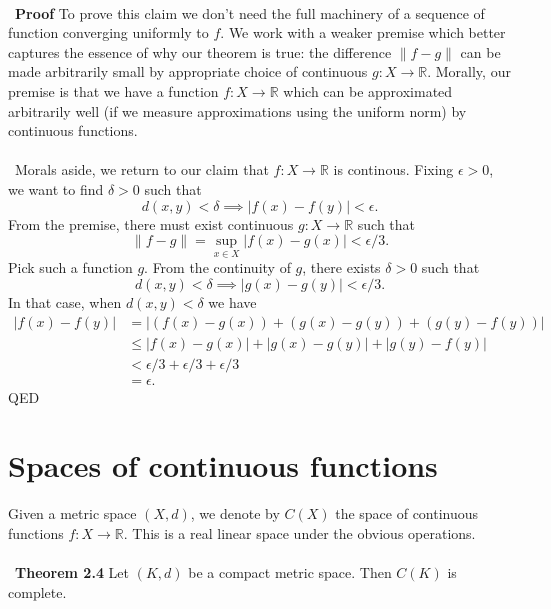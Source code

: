 \documentclass[12 pt]{article}
\newcommand{\R}{\mathbb{R}}
\newcommand{\nm}[1]{\left\| #1 \right\|}
\numberwithin{equation}{section}
\begin{document}
\\
\
\textbf{Proof} To prove this claim we don't need the full machinery of a sequence of function converging uniformly to $f$. We work with a weaker premise which better captures the essence of why our theorem is true: the difference $\nm{f - g}$ can be made arbitrarily small by appropriate choice of continuous $g: X \to \R$. Morally, our premise is that we have a function $f: X \to \R$ which can be approximated arbitrarily well (if we measure approximations using the uniform norm) by continuous functions.\\
\\
\
Morals aside, we return to our claim that $f: X \to \R$ is continous. Fixing $\epsilon > 0$, we want to find $\delta > 0$ such that \begin{equation*}
d(x,y) < \delta \implies |f(x) - f(y)| < \epsilon.
\end{equation*}
From the premise, there must exist continuous $g: X \to \R$ such that \begin{equation*}
\nm{f - g} = \sup_{x \in X} |f(x) - g(x)| < \epsilon / 3.
\end{equation*}
Pick such a function $g$. From the continuity of $g$, there exists $\delta > 0$ such that \begin{equation*}
d(x,y) < \delta \implies |g(x) - g(y)| < \epsilon / 3.
\end{equation*}
In that case, when $d(x,y) < \delta$ we have \begin{align*}
|f(x) - f(y)| & = |(f(x) - g(x)) + (g(x) - g(y)) + (g(y) - f(y))| \\
\ & \leq |f(x) - g(x)| + |g(x) - g(y)| + |g(y) - f(y)| \\ 
 & < \epsilon / 3 + \epsilon / 3 + \epsilon / 3 \\
\ & = \epsilon.
\end{align*}
QED




\section{Spaces of continuous functions}
Given a metric space $(X, d)$, we denote by $C(X)$ the space of continuous functions $f: X \to \R$. This is a real linear space under the obvious operations.\\
\\
\
\textbf{Theorem 2.4} Let $(K,d)$ be a compact metric space. Then $C(K)$ is complete.
\end{document}
